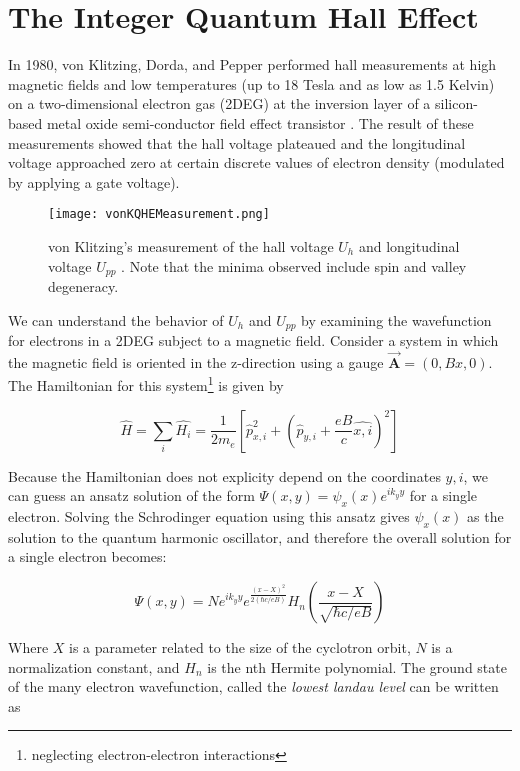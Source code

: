 \documentclass[12pt]{article}
\theoremstyle{definition}
\theoremstyle{remark}
\begin{document}
\section{The Integer Quantum Hall Effect}
In 1980, von Klitzing, Dorda, and Pepper performed hall measurements at high magnetic fields and low temperatures (up to 18 Tesla and as low as 1.5 Kelvin) on a two-dimensional electron gas (2DEG) at the inversion layer of a silicon-based metal oxide semi-conductor field effect transistor \cite{vonK:iqhe}. The result of these measurements showed that the hall voltage plateaued and the longitudinal voltage approached zero at certain discrete values of electron density (modulated by applying a gate voltage). 

\begin{figure}[h]
\centering
\texttt{[image: vonKQHEMeasurement.png]}
\caption{von Klitzing's measurement of the hall voltage $U_{h}$ and longitudinal voltage $U_{pp}$ \cite{vonK:ique}. Note that the minima observed include spin and valley degeneracy.}
\label{example}
\end{figure}

We can understand the behavior of $U_{h}$ and $U_{pp}$ by examining the wavefunction for electrons in a 2DEG subject to a magnetic field. Consider a system in which the magnetic field is oriented in the z-direction using a gauge $\vec{\mathbf{A}} = (0,Bx,0)$. The Hamiltonian for this system\footnote{neglecting electron-electron interactions} is given by

\begin{equation}
\hat{H} = \sum_{i} \hat{H_{i}} = \frac{1}{2m_{e}} \left[ \hat{p}_{x,i}^{2} + \left(\hat{p}_{y,i} + \frac{eB}{c} \hat{x,i} \right)^{2} \right]
\end{equation}

Because the Hamiltonian does not explicity depend on the coordinates $y,i$, we can guess an ansatz solution of the form $\Psi(x,y) = \psi_{x}(x) e^{ik_{y}y}$ for a single electron. Solving the Schrodinger equation using this ansatz gives $\psi_{x}(x)$ as the solution to the quantum harmonic oscillator, and therefore the overall solution for a single electron becomes:

\begin{equation}
\Psi(x,y) = N e^{ik_{y}y}e^{\frac{(x-X)^{2}}{2(\hbar c/eB)}} H_{n} \left(\frac{x-X}{\sqrt{\hbar c/ eB}} \right)
\end{equation}

Where $X$ is a parameter related to the size of the cyclotron orbit, $N$ is a normalization constant, and $H_{n}$ is the nth Hermite polynomial. The ground state of the many electron wavefunction, called the \textit{lowest landau level} can be written as \cite{yosh:qhe}
\end{document}
